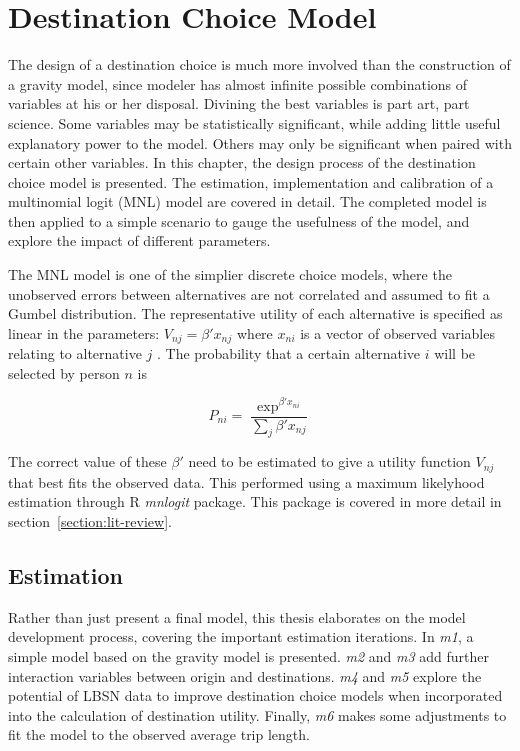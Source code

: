 \chapter{Destination Choice Model}
\label{section:destination-choice}
The design of a destination choice is much more involved than the construction of a gravity model, since modeler has almost infinite possible combinations of variables at his or her disposal. Divining the best variables is part art, part science. Some variables may be statistically significant, while adding little useful explanatory power to the model. Others may only be significant when paired with certain other variables. In this chapter, the design process of the destination choice model is presented. The estimation, implementation and calibration of a multinomial logit (MNL) model are covered in detail. The completed model is then applied to a simple scenario to gauge the usefulness of the model, and explore the impact of different parameters. 

The MNL model is one of the simplier discrete choice models, where the unobserved errors between alternatives are not correlated and assumed to fit a Gumbel distribution. The representative utility of each alternative is specified as linear in the parameters: $V_{nj} = \beta 'x_{nj}$ where $x_{ni}$ is a vector of observed variables relating to alternative $j$ \parencite{Train09}. The probability that a certain alternative $i$ will be selected by person $n$ is 

$$ P_{ni} =  \frac{\exp^{\beta'x_{ni}}}{\sum_j \beta'x_{nj}} $$

The correct value of these $\beta '$ need to be estimated to give a utility function $V_{nj}$ that best fits the observed data. This performed using a maximum likelyhood estimation through R \textit{mnlogit} package. This package is covered in more detail in section~\ref{section:lit-review}. 

\section{Estimation}
\label{section:estimation}
Rather than just present a final model, this thesis elaborates on the model development process, covering the important estimation iterations. In \textit{m1}, a simple model based on the gravity model is presented. \textit{m2} and \textit{m3} add further interaction variables between origin and destinations. \textit{m4} and \textit{m5} explore the potential of LBSN data to improve destination choice models when incorporated into the calculation of destination utility. Finally, \textit{m6} makes some adjustments to fit the model to the observed average trip length.


